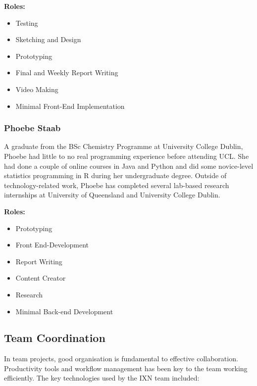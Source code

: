 \documentclass[fontsize=10pt]{extarticle}
\numberwithin{figure}{section} %
\providecommand{\tightlist}{%
  \setlength{\itemsep}{0pt}\setlength{\parskip}{0pt}}
\begin{document}
\textbf{Roles:}

\begin{itemize}
\tightlist
\item
  Testing
\item
  Sketching and Design
\item
  Prototyping
\item
  Final and Weekly Report Writing
\item
  Video Making
\item
  Minimal Front-End Implementation
\end{itemize}

\hypertarget{phoebe-staab}{%
\subsubsection{Phoebe Staab}\label{phoebe-staab}}

A graduate from the BSc Chemistry Programme at University College
Dublin, Phoebe had little to no real programming experience before
attending UCL. She had done a couple of online courses in Java and
Python and did some novice-level statistics programming in R during her
undergraduate degree. Outside of technology-related work, Phoebe has
completed several lab-based research internships at University of
Queensland and University College Dublin.

\textbf{Roles:}

\begin{itemize}
\tightlist
\item
  Prototyping
\item
  Front End-Development
\item
  Report Writing
\item
  Content Creator
\item
  Research
\item
  Minimal Back-end Development
\end{itemize}

\hypertarget{team-coordination}{%
\subsection{Team Coordination}\label{team-coordination}}

In team projects, good organisation is fundamental to effective
collaboration. Productivity tools and workflow management has been key
to the team working efficiently. The key technologies used by the IXN
team included:
\end{document}
